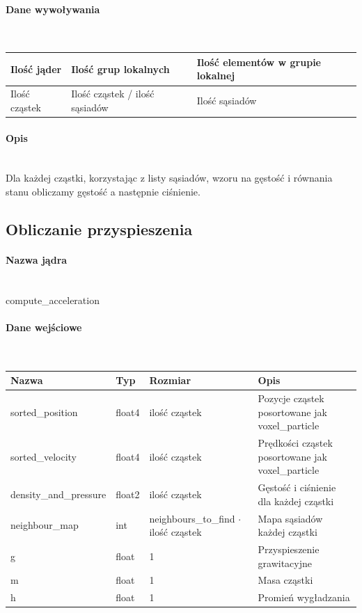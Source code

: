 \documentclass[polish, 12pt]{aghthesis}
\begin{document}
				\paragraph{Dane wywoływania} \ \\
					\begin{tabular}{| p{} | p{} | p{}|}
					\hline
						Ilość jąder & Ilość grup lokalnych & Ilość elementów w grupie lokalnej \\
					\hline
						Ilość cząstek & Ilość cząstek / ilość sąsiadów & Ilość sąsiadów \\ 
					\hline
					\end{tabular}
				\paragraph{Opis} \ \\
					\indent Dla każdej cząstki, korzystając z listy sąsiadów, wzoru na gęstość i równania stanu obliczamy gęstość a następnie ciśnienie. 
		\subsection{Obliczanie przyspieszenia}
				\paragraph{Nazwa jądra} \ \\
					compute\_acceleration
				\paragraph{Dane wejściowe} \ \\
					\begin{tabular}{| p{} | p{} | p{} | p{} |}
					\hline
						Nazwa & Typ & Rozmiar & Opis \\
					\hline
						sorted\_position & float4 & ilość cząstek & Pozycje cząstek posortowane jak voxel\_particle\\
					\hline
						sorted\_velocity & float4 & ilość cząstek & Prędkości cząstek posortowane jak voxel\_particle\\
					\hline
						density\_and\_pressure & float2 & ilość cząstek & Gęstość i ciśnienie dla każdej cząstki\\
					\hline
						neighbour\_map & int & neighbours\_to\_find ${\cdot}$ ilość cząstek & Mapa sąsiadów każdej cząstki\\
					\hline
						g & float & 1 & Przyspieszenie grawitacyjne \\ 
					\hline
						m & float & 1 & Masa cząstki \\ 
					\hline
						h & float & 1 & Promień wygładzania \\ 
					\hline	
				\end{tabular}
\end{document}
